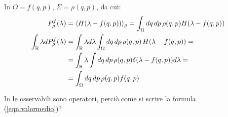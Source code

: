 \documentclass[FisicaTeorica.tex]{subfiles}
\begin{document}
In \textbf{\MC} $O=f(q,p)$, $\Sigma=\rho(q,p)$, da cui:
\begin{align*}
    P_\rho^f(\lambda)&=\langle H( \lambda-f(q,p)) \rangle_\rho= \int_{\Omega}{dq\, dp\,\rho(q,p)H(\lambda-f(q,p))}\\
    \int_{\mathbb{R}} \lambda dP_\rho^f (\lambda) &= \int_{\mathbb{R}} \lambda d\lambda \int_\Omega dq\,dp\,\rho(q,p)\, H(\lambda-f(q,p)) = \\
    &= \int_{\mathbb{R}} \lambda \int dq\,dp\,\rho(q,p) \delta(\lambda-f(q,p))d\lambda = \\
    &= \int_\Omega dq\, dp\, \rho(q,p) f(q,p)
\end{align*}

\begin{question}
In \textbf{\MQ} le osservabili sono operatori, perciò come si scrive la formula (\ref{eqn:valormedio})?
\label{q:prob-mq}
\end{question}
\end{document}
